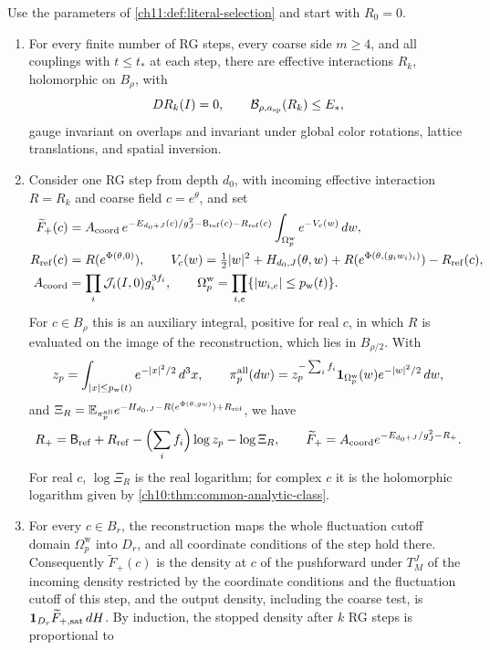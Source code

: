 \begin{theorem}\label{ch11:thm:deep-buffer-law}
Use the parameters of \cref{ch11:def:literal-selection} and start with $R_0=0$.
\begin{enumerate}
\item For every finite number of RG steps, every coarse side $m\ge4$, and all couplings with $t\le t_*$ at each step, there are effective interactions $R_k$, holomorphic on $B_\rho$, with
\[
 DR_k(I)=0,\qquad\mathcal B_{\rho,a_{\mathrm{sp}}}(R_k)\le E_*,
\]
gauge invariant on overlaps and invariant under global color rotations, lattice translations, and spatial inversion.
\item Consider one RG step from depth $d_0$, with incoming effective interaction $R=R_k$ and coarse field $c=e^\theta$, and set
\[
 \begin{split}
 \widetilde F_+(c)&=A_{\mathrm{coord}}\,
 e^{-E_{d_0+J}(c)/g_J^2-\mathsf B_{\mathrm{ref}}(c)-R_{\mathrm{ref}}(c)}
 \int_{\Omega_p^{\mathrm w}}e^{-V_c(w)}\,dw,\\
 R_{\mathrm{ref}}(c)&=R(e^{\Phi(\theta,0)}),\qquad
 V_c(w)=\tfrac12\lvert w\rvert^2+H_{d_0,J}(\theta,w)+R(e^{\Phi(\theta,(g_iw_i)_i)})-R_{\mathrm{ref}}(c),\\
 A_{\mathrm{coord}}&=\prod_i\mathcal J_i(I,0)g_i^{3f_i},\qquad
 \Omega_p^{\mathrm w}=\prod_{i,e}\{\lvert w_{i,e}\rvert\le p_{\mathrm w}(t)\}.
 \end{split}
\]
For $c\in B_\rho$ this is an auxiliary integral, positive for real $c$, in which $R$ is evaluated on the image of the reconstruction, which lies in $B_{\rho/2}$. With
\[
 z_p=\int_{\lvert x\rvert\le p_{\mathrm w}(t)}e^{-\lvert x\rvert^2/2}\,d^3x,\qquad
 \pi_p^{\mathrm{all}}(dw)=z_p^{-\sum_if_i}\mathbf 1_{\Omega_p^{\mathrm w}}(w)e^{-\lvert w\rvert^2/2}\,dw,
\]
and $\Xi_R=\mathbb E_{\pi_p^{\mathrm{all}}}e^{-H_{d_0,J}-R(e^{\Phi(\theta,gw)})+R_{\mathrm{ref}}}$, we have
\[
 R_+=\mathsf B_{\mathrm{ref}}+R_{\mathrm{ref}}-\Bigl(\sum_if_i\Bigr)\log z_p-\log\Xi_R,
 \qquad
 \widetilde F_+=A_{\mathrm{coord}}e^{-E_{d_0+J}/g_J^2-R_+}.
\]
For real $c$, $\log\Xi_R$ is the real logarithm; for complex $c$ it is the holomorphic logarithm given by \cref{ch10:thm:common-analytic-class}.
\item For every $c\in B_r$, the reconstruction maps the whole fluctuation cutoff domain $\Omega_p^{\mathrm w}$ into $D_r$, and all coordinate conditions of the step hold there. Consequently $\widetilde F_+(c)$ is the density at $c$ of the pushforward under $T_M^J$ of the incoming density restricted by the coordinate conditions and the fluctuation cutoff of this step, and the output density, including the coarse test, is $\mathbf 1_{D_r}\widetilde F_{+,\mathrm{sat}}\,dH$. By induction, the stopped density after $k$ RG steps is proportional to

\end{enumerate}
\end{theorem}
